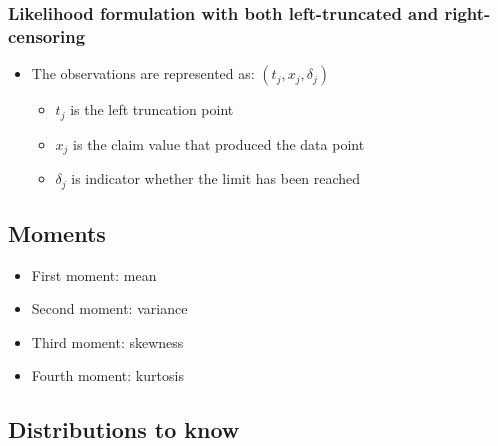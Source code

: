 \documentclass{article}
\begin{document}
\subsubsection{Likelihood formulation with both left-truncated and right-censoring}
\begin{itemize}
    \item The observations are represented as: $(t_j, x_j, \delta_j)$
    \begin{itemize}
        \item $t_j$ is the left truncation point
        \item $x_j$ is the claim value that produced the data point
        \item $\delta_j$ is indicator whether the limit has been reached
    \end{itemize}
\end{itemize}



\subsection{Moments}

\begin{itemize}
    \item First moment: mean
    \item Second moment: variance
    \item Third moment: skewness
    \item Fourth moment: kurtosis
\end{itemize}

\subsection{Distributions to know}
\end{document}
